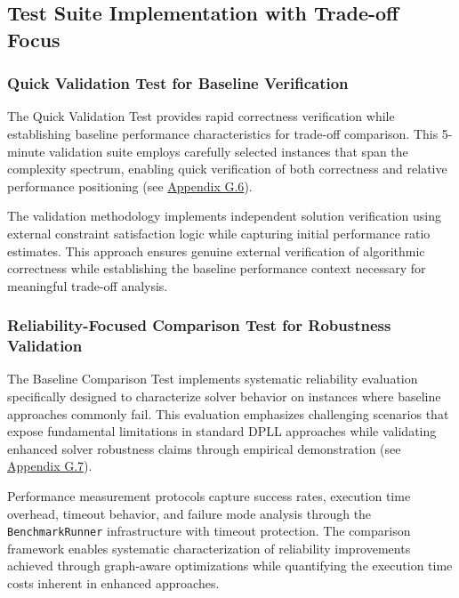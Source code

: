 \subsection{Test Suite Implementation with Trade-off Focus}
\label{sec:test-suite-implementation}

\subsubsection{Quick Validation Test for Baseline Verification}
\label{sec:quick-validation-test}

The Quick Validation Test provides rapid correctness verification while establishing baseline performance characteristics for trade-off comparison. This 5-minute validation suite employs carefully selected instances that span the complexity spectrum, enabling quick verification of both correctness and relative performance positioning (see \hyperref[appendix:quick-validation]{Appendix G.6}).

The validation methodology implements independent solution verification using external constraint satisfaction logic while capturing initial performance ratio estimates. This approach ensures genuine external verification of algorithmic correctness while establishing the baseline performance context necessary for meaningful trade-off analysis.

\subsubsection{Reliability-Focused Comparison Test for Robustness Validation}
\label{sec:baseline-comparison-test}

The Baseline Comparison Test implements systematic reliability evaluation specifically designed to characterize solver behavior on instances where baseline approaches commonly fail. This evaluation emphasizes challenging scenarios that expose fundamental limitations in standard DPLL approaches while validating enhanced solver robustness claims through empirical demonstration (see \hyperref[appendix:reliability-testing]{Appendix G.7}).

Performance measurement protocols capture success rates, execution time overhead, timeout behavior, and failure mode analysis through the \texttt{BenchmarkRunner} infrastructure with timeout protection. The comparison framework enables systematic characterization of reliability improvements achieved through graph-aware optimizations while quantifying the execution time costs inherent in enhanced approaches.

